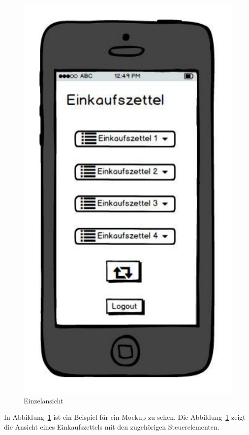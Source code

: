 \documentclass[10pt, conference, compsocconf]{IEEEtran}
\begin{document}
\begin{figure}[h!]
	\centering
	\includegraphics[scale=0.3]{./Bilder_Zeichnungen/Uebersicht.pdf}
	\caption{Einzelansicht}
	\label{fig:Mockup_Einzelansicht}
\end{figure}
In Abbildung~\ref{fig:Mockup_Einzelansicht} ist ein Beispiel f\"ur ein Mockup zu sehen. Die Abbildung~\ref{fig:Mockup_Einzelansicht} zeigt die Ansicht eines Einkaufszettels mit den zugeh\"origen Steuerelementen.
\end{document}
